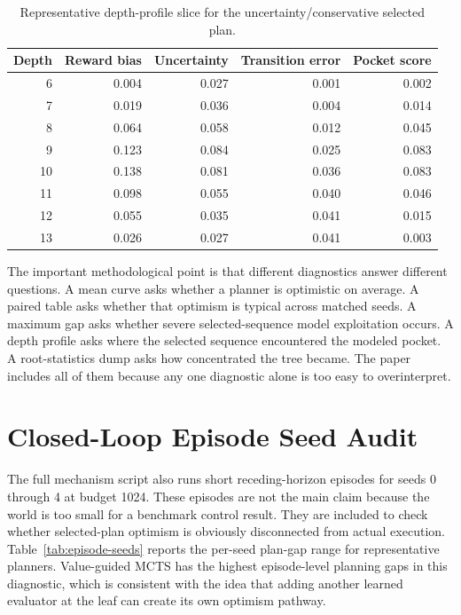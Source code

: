 \documentclass{article}
\begin{document}
\begin{table}[htbp]
\caption{Representative depth-profile slice for the uncertainty/conservative selected plan.}
\label{tab:depth-slice}
\begin{center}
\small
\begin{tabular}{rrrrr}
\toprule
Depth & Reward bias & Uncertainty & Transition error & Pocket score \\
\midrule
6 & 0.004 & 0.027 & 0.001 & 0.002 \\
7 & 0.019 & 0.036 & 0.004 & 0.014 \\
8 & 0.064 & 0.058 & 0.012 & 0.045 \\
9 & 0.123 & 0.084 & 0.025 & 0.083 \\
10 & 0.138 & 0.081 & 0.036 & 0.083 \\
11 & 0.098 & 0.055 & 0.040 & 0.046 \\
12 & 0.055 & 0.035 & 0.041 & 0.015 \\
13 & 0.026 & 0.027 & 0.041 & 0.003 \\
\bottomrule
\end{tabular}
\end{center}
\end{table}

The important methodological point is that different diagnostics answer different questions. A mean curve asks whether a planner is optimistic on average. A paired table asks whether that optimism is typical across matched seeds. A maximum gap asks whether severe selected-sequence model exploitation occurs. A depth profile asks where the selected sequence encountered the modeled pocket. A root-statistics dump asks how concentrated the tree became. The paper includes all of them because any one diagnostic alone is too easy to overinterpret.

\section{Closed-Loop Episode Seed Audit}

The full mechanism script also runs short receding-horizon episodes for seeds 0 through 4 at budget 1024. These episodes are not the main claim because the world is too small for a benchmark control result. They are included to check whether selected-plan optimism is obviously disconnected from actual execution. Table~\ref{tab:episode-seeds} reports the per-seed plan-gap range for representative planners. Value-guided MCTS has the highest episode-level planning gaps in this diagnostic, which is consistent with the idea that adding another learned evaluator at the leaf can create its own optimism pathway.
\end{document}
